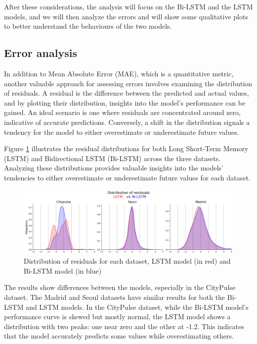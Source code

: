 After these considerations, the analysis will focus on the Bi-LSTM and the LSTM models, and we will then analyze the errors and will show some qualitative plots to better understand the behaviours of the two models.

\subsection{Error analysis}

In addition to Mean Absolute Error (MAE), which is a quantitative metric, another valuable approach for assessing errors involves examining the distribution of residuals. A residual is the difference between the predicted and actual values, and by plotting their distribution, insights into the model's performance can be gained. An ideal scenario is one where residuals are concentrated around zero, indicative of accurate predictions. Conversely, a shift in the distribution signals a tendency for the model to either overestimate or underestimate future values.

Figure \ref{fig:kde_residuals} illustrates the residual distributions for both Long Short-Term Memory (LSTM) and Bidirectional LSTM (Bi-LSTM) across the three datasets. Analyzing these distributions provides valuable insights into the models' tendencies to either overestimate or underestimate future values for each dataset.

\begin{figure}
    \centering
    \includegraphics[width=1\linewidth]{images/Residuals_distribution.png}
    \caption{Distribution of residuals for each dataset, LSTM model (in red) and Bi-LSTM model (in blue)}
    \label{fig:kde_residuals}
\end{figure}

The results show differences between the models, especially in the CityPulse dataset. The Madrid and Seoul datasets have similar results for both the Bi-LSTM and LSTM models. In the CityPulse dataset, while the Bi-LSTM model's performance curve is skewed but mostly normal, the LSTM model shows a distribution with two peaks: one near zero and the other at -1.2. This indicates that the model accurately predicts some values while overestimating others.

